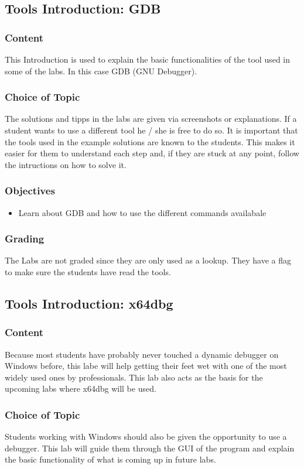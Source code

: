 \subsection{Tools Introduction: GDB}
\subsubsection*{Content}
This Introduction is used to explain the basic functionalities of the tool used in some of the labs. In this case GDB (GNU Debugger).
\subsubsection*{Choice of Topic}
The solutions and tipps in the labs are given via screenshots or explanations. If a student wants to use a different tool he / she is free to do so. It is important that the tools used in the example solutions are known to the students. This makes it easier for them to understand each step and, if they are stuck at any point, follow the intructions on how to solve it. 
\subsubsection*{Objectives}
\begin{itemize}
    \item Learn about GDB and how to use the different commands availabale
\end{itemize}
\subsubsection*{Grading}
The Labs are not graded since they are only used as a lookup. They have a flag to make sure the students have read the tools.

\subsection{Tools Introduction: x64dbg}
\subsubsection*{Content}
Because most students have probably never touched a dynamic debugger on Windows before, this labe will help getting their feet wet with one of the most widely used ones by professionals.
This lab also acts as the basis for the upcoming labs where x64dbg will be used.
\subsubsection*{Choice of Topic}
Students working with Windows should also be given the opportunity to use a debugger. This lab will guide them through the GUI of the program and explain the basic functionality of what is coming up in future labs.
